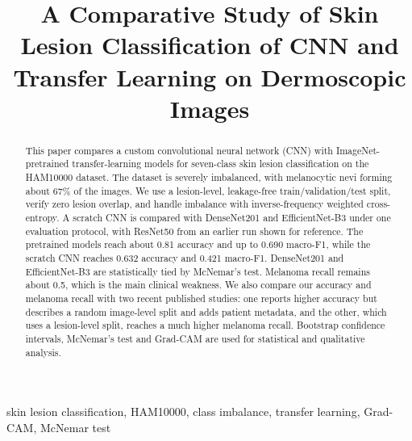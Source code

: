 \documentclass[conference]{IEEEtran}
\begin{document}
\title{A Comparative Study of Skin Lesion Classification of CNN and Transfer Learning on Dermoscopic Images}

\author{
\and
{}
}

\maketitle

\begin{abstract}
This paper compares a custom convolutional neural network (CNN) with ImageNet-pretrained transfer-learning models for seven-class skin lesion classification on the HAM10000 dataset. The dataset is severely imbalanced, with melanocytic nevi forming about 67\% of the images. We use a lesion-level, leakage-free train/validation/test split, verify zero lesion overlap, and handle imbalance with inverse-frequency weighted cross-entropy. A scratch CNN is compared with DenseNet201 and EfficientNet-B3 under one evaluation protocol, with ResNet50 from an earlier run shown for reference. The pretrained models reach about 0.81 accuracy and up to 0.690 macro-F1, while the scratch CNN reaches 0.632 accuracy and 0.421 macro-F1. DenseNet201 and EfficientNet-B3 are statistically tied by McNemar's test. Melanoma recall remains about 0.5, which is the main clinical weakness. We also compare our accuracy and melanoma recall with two recent published studies: one reports higher accuracy but describes a random image-level split and adds patient metadata, and the other, which uses a lesion-level split, reaches a much higher melanoma recall. Bootstrap confidence intervals, McNemar's test and Grad-CAM are used for statistical and qualitative analysis.
\end{abstract}

\begin{IEEEkeywords}
skin lesion classification, HAM10000, class imbalance, transfer learning, Grad-CAM, McNemar test
\end{IEEEkeywords}
\end{document}

